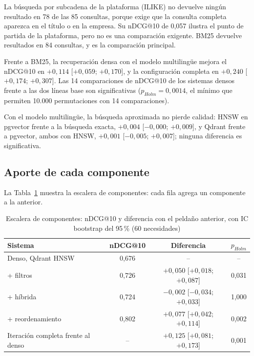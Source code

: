 La búsqueda por subcadena de la plataforma (ILIKE) no devuelve ningún resultado en 78 de las 85 consultas, porque exige que la consulta completa aparezca en el título o en la empresa. Su nDCG@10 de 0,057 ilustra el punto de partida de la plataforma, pero no es una comparación exigente. BM25 devuelve resultados en 84 consultas, y es la comparación principal.

Frente a BM25, la recuperación densa con el modelo multilingüe mejora el nDCG@10 en $+0{,}114$ [$+0{,}059$; $+0{,}170$], y la configuración completa en $+0{,}240$ [$+0{,}174$; $+0{,}307$]. Las 14 comparaciones de nDCG@10 de los sistemas densos frente a las dos líneas base son significativas ($p_{Holm} = 0{,}0014$, el mínimo que permiten 10.000 permutaciones con 14 comparaciones).

Con el modelo multilingüe, la búsqueda aproximada no pierde calidad: HNSW en pgvector frente a la búsqueda exacta, $+0{,}004$ [$-0{,}000$; $+0{,}009$], y Qdrant frente a pgvector, ambos con HNSW, $+0{,}001$ [$-0{,}005$; $+0{,}007$]; ninguna diferencia es significativa.

\subsection{Aporte de cada componente}

La Tabla~\ref{tab:res-escalera} muestra la escalera de componentes: cada fila agrega un componente a la anterior.

\begin{table}[htbp!]
    \centering
    \caption{Escalera de componentes: nDCG@10 y diferencia con el peldaño anterior, con IC bootstrap del 95\,\% (60 necesidades)}
    \label{tab:res-escalera}
    \begin{tabular}{|l|c|c|c|}
        \hline
        \textbf{Sistema} & \textbf{nDCG@10} & \textbf{Diferencia} & \textbf{$p_{Holm}$} \\
        \hline
        Denso, Qdrant HNSW & 0{,}676 & -- & -- \\
        \hline
        + filtros & 0{,}726 & $+0{,}050$ [$+0{,}018$; $+0{,}087$] & 0{,}031 \\
        \hline
        + híbrida & 0{,}724 & $-0{,}002$ [$-0{,}034$; $+0{,}033$] & 1{,}000 \\
        \hline
        + reordenamiento & 0{,}802 & $+0{,}077$ [$+0{,}042$; $+0{,}114$] & 0{,}002 \\
        \hline
        Iteración completa frente al denso & -- & $+0{,}125$ [$+0{,}081$; $+0{,}173$] & 0{,}001 \\
        \hline
    \end{tabular}
\end{table}

